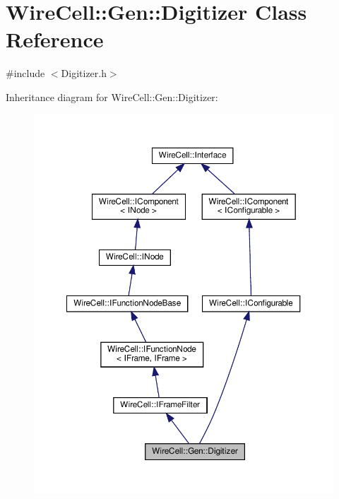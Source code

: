 \hypertarget{class_wire_cell_1_1_gen_1_1_digitizer}{}\section{Wire\+Cell\+:\+:Gen\+:\+:Digitizer Class Reference}
\label{class_wire_cell_1_1_gen_1_1_digitizer}


{\ttfamily \#include $<$Digitizer.\+h$>$}



Inheritance diagram for Wire\+Cell\+:\+:Gen\+:\+:Digitizer\+:
\nopagebreak
\begin{figure}[H]
\begin{center}
\leavevmode
\includegraphics[width=350pt]{class_wire_cell_1_1_gen_1_1_digitizer__inherit__graph}
\end{center}
\end{figure}


